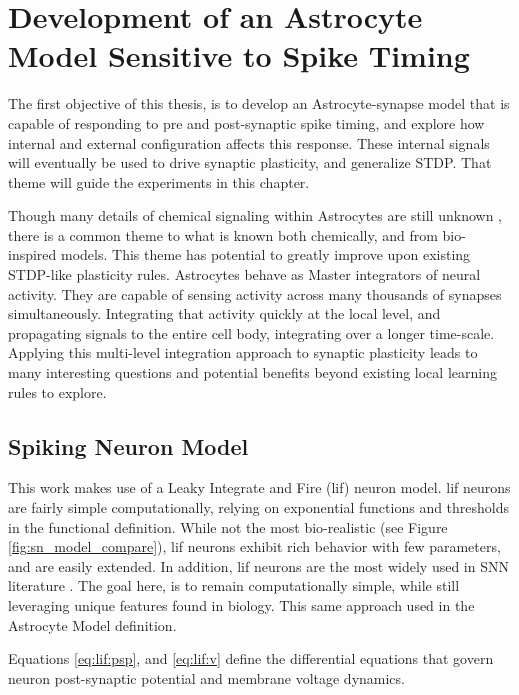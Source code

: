 %

\chapter{Development of an Astrocyte Model Sensitive to Spike Timing} \label{chapter:obj1}
The first objective of this thesis, is to develop an Astrocyte-synapse model
that is capable of responding to pre and post-synaptic spike timing, and
explore how internal and external configuration affects this response. These
internal signals will eventually be used to drive synaptic plasticity, and
generalize STDP. That theme will guide the experiments in this chapter.

Though many details of chemical signaling within Astrocytes are still unknown
\parencite{manninen_2018}, there is a common theme to what is known both chemically,
and from bio-inspired models. This theme has potential to greatly improve upon
existing STDP-like plasticity rules. Astrocytes behave as Master integrators of
neural activity. They are capable of sensing activity across many thousands of
synapses simultaneously. Integrating that activity quickly at the local level,
and propagating signals to the entire cell body, integrating over a longer
time-scale. Applying this multi-level integration approach to synaptic
plasticity leads to many interesting questions and potential benefits beyond
existing local learning rules to explore.

\section{Spiking Neuron Model}
This work makes use of a Leaky Integrate and Fire (\Gls{lif}) neuron model. \Gls{lif}
neurons are fairly simple computationally, relying on exponential functions
and thresholds in the functional definition. While not the most
bio-realistic (see Figure \ref{fig:sn_model_compare}), \Gls{lif} neurons exhibit
rich behavior with few parameters, and are easily extended. In addition, \Gls{lif}
neurons are the most widely used in SNN literature \parencite{ponulak_2011}. The
goal here, is to remain computationally simple, while still leveraging unique
features found in biology. This same approach used in the Astrocyte Model
definition.

Equations \ref{eq:lif:psp}, and \ref{eq:lif:v} define the differential equations
that govern neuron post-synaptic potential and membrane voltage dynamics.

